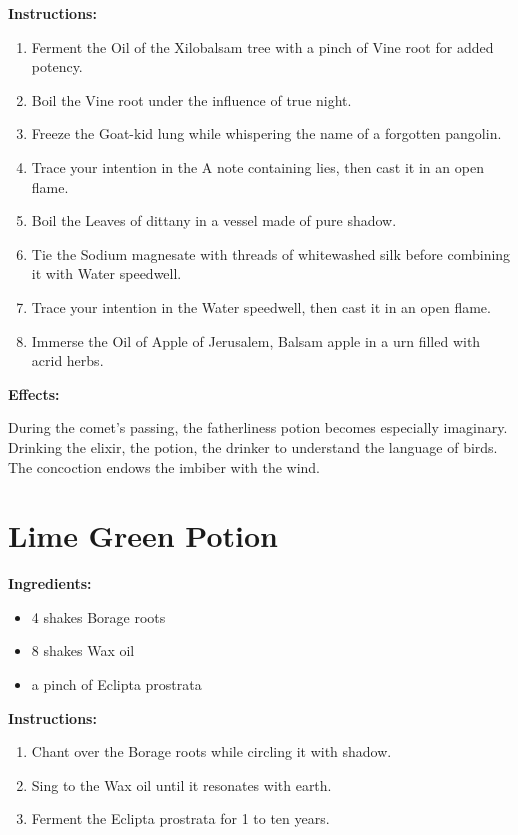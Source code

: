 \documentclass{article}
\begin{document}
\textbf{Instructions:}

\begin{enumerate}
  \item Ferment the Oil of the Xilobalsam tree with a pinch of Vine root for added potency.
  \item Boil the Vine root under the influence of true night.
  \item Freeze the Goat-kid lung while whispering the name of a forgotten pangolin.
  \item Trace your intention in the A note containing lies, then cast it in an open flame.
  \item Boil the Leaves of dittany in a vessel made of pure shadow.
  \item Tie the Sodium magnesate with threads of whitewashed silk before combining it with Water speedwell.
  \item Trace your intention in the Water speedwell, then cast it in an open flame.
  \item Immerse the Oil of Apple of Jerusalem, Balsam apple in a urn filled with acrid herbs.
\end{enumerate}

\textbf{Effects:}

During the comet’s passing, the fatherliness potion becomes especially imaginary. Drinking the elixir, the potion, the drinker to understand the language of birds. The concoction endows the imbiber with the wind.

\newpage
\section*{Lime Green Potion}

\textbf{Ingredients:}

\begin{itemize}
  \item 4 shakes Borage roots
  \item 8 shakes Wax oil
  \item a pinch of Eclipta prostrata
\end{itemize}

\textbf{Instructions:}

\begin{enumerate}
  \item Chant over the Borage roots while circling it with shadow.
  \item Sing to the Wax oil until it resonates with earth.
  \item Ferment the Eclipta prostrata for 1 to ten years.
\end{enumerate}
\end{document}
